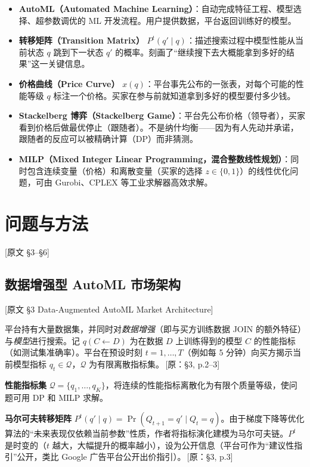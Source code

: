 \documentclass[12pt,a4paper]{article}
\newcommand{\srcref}[1]{\textcolor{black!65}{\footnotesize\,[原：#1]}}
\newcommand{\secref}[1]{\hspace{0.6em} \textcolor{black!80}{\footnotesize [原文 #1]}}
\theoremstyle{definition}
\begin{document}
\begin{itemize}[leftmargin=*]
    \item \textbf{AutoML（Automated Machine Learning）}：自动完成特征工程、模型选择、超参数调优的 ML 开发流程。用户提供数据，平台返回训练好的模型。
    \item \textbf{转移矩阵（Transition Matrix）} $P^t(q' \mid q)$：描述搜索过程中模型性能从当前状态 $q$ 跳到下一状态 $q'$ 的概率。刻画了``继续搜下去大概能拿到多好的结果''这一关键信息。
    \item \textbf{价格曲线（Price Curve）} $x(q)$：平台事先公布的一张表，对每个可能的性能等级 $q$ 标注一个价格。买家在参与前就知道拿到多好的模型要付多少钱。
    \item \textbf{Stackelberg 博弈（Stackelberg Game）}：平台先公布价格（领导者），买家看到价格后做最优停止（跟随者）。不是纳什均衡——因为有人先动并承诺，跟随者的反应可以被精确计算（DP）而非猜测。
    \item \textbf{MILP（Mixed Integer Linear Programming，混合整数线性规划）}：同时包含连续变量（价格）和离散变量（买家的选择 $z\in\{0,1\}$）的线性优化问题，可由 Gurobi、CPLEX 等工业求解器高效求解。
\end{itemize}

\section{问题与方法}
\secref{§3--§6}

\subsection{数据增强型 AutoML 市场架构}
\secref{§3 Data-Augmented AutoML Market Architecture}

平台持有大量数据集，并同时对\emph{数据增强}（即与买方训练数据 JOIN 的额外特征）与\emph{模型}进行搜索。记 $q(C \leftarrow D)$ 为在数据 $D$ 上训练得到的模型 $C$ 的性能指标（如测试集准确率）。平台在预设时刻 $t=1,\dots,T$（例如每 5 分钟）向买方揭示当前模型指标 $q_t\in\mathcal{Q}$，$\mathcal{Q}$ 为有限离散指标集。\srcref{§3, p.2--3}

\textbf{性能指标集} $\mathcal{Q}=\{q_1,\dots,q_K\}$，将连续的性能指标离散化为有限个质量等级，使问题可用 DP 和 MILP 求解。

\textbf{马尔可夫转移矩阵} $P^t(q' \mid q) = \Pr(Q_{t+1}=q' \mid Q_t=q)$。由于梯度下降等优化算法的``未来表现仅依赖当前参数''性质，作者将指标演化建模为马尔可夫链。$P^t$ 是时变的（$t$ 越大，大幅提升的概率越小），设为公开信息（平台可作为``建议性指引''公开，类比 Google 广告平台公开出价指引）。\srcref{§3, p.3}
\end{document}

